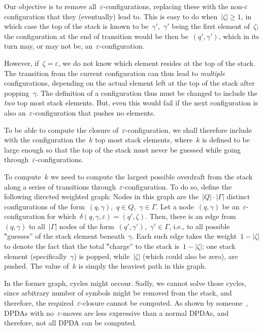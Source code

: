 Our objective is to remove all~$ε$-configurations,
  replacing these with the non-$ε$ configuration that
  they (eventually) lead to.
This is easy to do when~$|ζ|≥1$, in which
  case the top of the stack is known to be~$γ'$,~$γ'$ being the first
    element of~$ζ$; the configuration at the end of transition
    would be then be~$(q',γ')$, which in its turn may, or may not be,
    an~$ε$-configuration.

However, if~$ζ=ε$, we do not know which element resides at the top
  of the stack.
The transition from the current configuration can thus lead to \emph{multiple} configurations,
  depending on the actual element left at the top of the stack after popping~$γ$.
The definition of a configuration thus must be changed to include the \emph{two} top
  most stack elements.
But, even this would fail if the next configuration is also an~$ε$-configuration that pushes no elements.

To be able to compute the closure of~$ε$-configuration, we shall
  therefore include with the configuration the~$k$ top most stack elements,
  where~$k$ is defined to be large enough so that
  the top of the stack must never be guessed while going
  through~$ε$-configurations.

To compute~$k$ we need to compute the largest possible overdraft
  from the stack along a series of transitions through~$ε$-configuration.
To do so, define the following directed weighted graph:
Nodes in this graph are the~$|Q|·|Γ|$ distinct configurations
  of the form~$(q,γ)$,~$q∈Q$,~$γ∈Γ$.
Let a node~$(q,γ)$ be an~$ε$-configuration for which~$δ(q,γ,ε)=(q',ζ)$.
Then, there is an edge from~$(q,γ)$ to all~$|Γ|$ nodes of the form~$(q',γ')$,~$γ'∈Γ$, i.e.,
  to all possible ‟guesses” of the stack element beneath~$γ$.
Each such edge takes the weight~$1-|ζ|$ to denote the fact
  that the total ‟charge” to the stack is~$1-|ζ|$:
    one stack element (specifically~$γ$) is popped,
    while~$|ζ|$ (which could also be zero), are pushed.
The value of~$k$ is simply the heaviest path in this graph.

In the former graph, cycles might occour.
Sadly, we cannot solve those cycles, since arbitrary number of symbols might be removed from the
  stack, and therefore, the required~$ε$-closure cannot be computed.
As shown by someone~\cite{i:need:to::find:it}, DPDAs with no~$ε$-moves are less expressive than a normal DPDAs,
  and therefore, not all DPDA can be computed.

